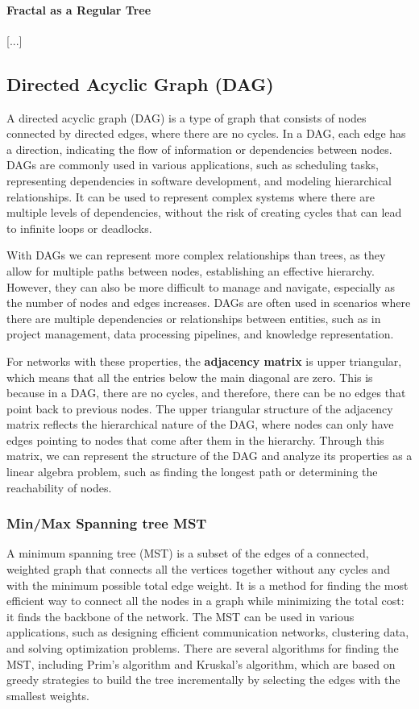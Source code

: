 \paragraph{Fractal as a Regular Tree}

[...]

\subsection{Directed Acyclic Graph (DAG)}

A directed acyclic graph (DAG) is a type of graph that consists of nodes connected by directed edges, where there are no cycles. In a DAG, each edge has a direction, indicating the flow of information or dependencies between nodes. DAGs are commonly used in various applications, such as scheduling tasks, representing dependencies in software development, and modeling hierarchical relationships. It can be used to represent complex systems where there are multiple levels of dependencies, without the risk of creating cycles that can lead to infinite loops or deadlocks.

With DAGs we can represent more complex relationships than trees, as they allow for multiple paths between nodes, establishing an effective hierarchy. However, they can also be more difficult to manage and navigate, especially as the number of nodes and edges increases. DAGs are often used in scenarios where there are multiple dependencies or relationships between entities, such as in project management, data processing pipelines, and knowledge representation.

For networks with these properties, the \textbf{adjacency matrix} is upper triangular, which means that all the entries below the main diagonal are zero. This is because in a DAG, there are no cycles, and therefore, there can be no edges that point back to previous nodes. The upper triangular structure of the adjacency matrix reflects the hierarchical nature of the DAG, where nodes can only have edges pointing to nodes that come after them in the hierarchy. Through this matrix, we can represent the structure of the DAG and analyze its properties as a linear algebra problem, such as finding the longest path or determining the reachability of nodes.

\subsubsection{Min/Max Spanning tree MST}

A minimum spanning tree (MST) is a subset of the edges of a connected, weighted graph that connects all the vertices together without any cycles and with the minimum possible total edge weight. It is a method for finding the most efficient way to connect all the nodes in a graph while minimizing the total cost: it finds the backbone of the network. The MST can be used in various applications, such as designing efficient communication networks, clustering data, and solving optimization problems. There are several algorithms for finding the MST, including Prim's algorithm and Kruskal's algorithm, which are based on greedy strategies to build the tree incrementally by selecting the edges with the smallest weights.

